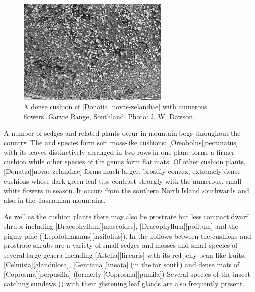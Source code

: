 \begin{figure}
	\includegraphics[width=0.66\textwidth]{graphics/figure104donatia.jpg}
	\centering
	\caption[\emph{Donatia novae-zelandiae}]{A dense cushion of [Donatia][novae-zelandiae] with numerous flowers.
	Garvie Range, Southland.
	Photo: J. W. Dawson.}%
	\label{fig:104donatio}
\end{figure}

A number of sedges and related plants occur in mountain bogs throughout the country.
The  and  species form soft moss-like cushions; [Oreobolus][pectinatus] with its leaves distinctively arranged in two rows in one plane forms a firmer cushion while other species of the genus form flat mats.
Of other cushion plants, [Donatia][novae-zelandiae] forms much larger, broadly convex, extremely dense cushions whose dark green leaf tips contrast strongly with the numerous, small white flowers in season.
It occurs from the southern North Island southwards and also in the Tasmanian mountains.

As well as the cushion plants there may also be prostrate but less compact dwarf shrubs including [Dracophyllum][muscoides], [Dracophyllum][politum] and the pigmy pine ([Lepidothamnus][laxifolius]).
In the hollows between the cushions and prostrate shrubs are a variety of small sedges and mosses and small species of several large genera including [Astelia][linearis] with its red jelly bean-like fruits, [Celmisia][glandulosa], [Gentiana][lineata] (in the far south) and dense mats of [Coprosma][perpusilla] (formerly [Coprosma][pumila]) Several species of the insect catching sundews () with their glistening leaf glands are also frequently present.

